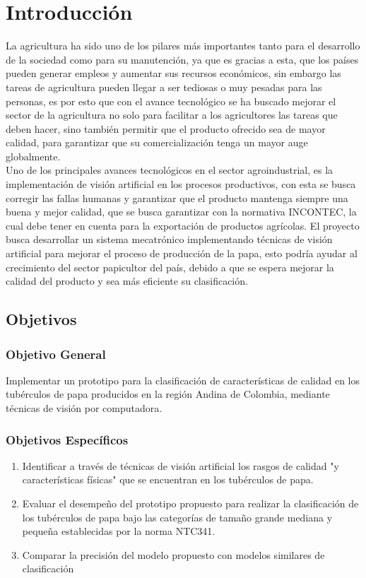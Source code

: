 \cleardoublepage %

\chapter{Introducción}

La agricultura ha sido uno de los pilares más importantes tanto para el desarrollo de la sociedad como para su manutención, ya que es gracias a esta, que los países pueden generar empleos y aumentar sus recursos económicos, sin embargo las tareas de agricultura pueden llegar a ser tediosas o muy pesadas para las personas, es por esto que con el avance tecnológico se ha buscado mejorar el sector de la agricultura no solo para facilitar a los agricultores las tareas que deben hacer, sino también permitir que el producto ofrecido sea de mayor calidad, para garantizar que su comercialización tenga un mayor auge globalmente.\\

Uno de los principales avances tecnológicos en el sector agroindustrial, es la implementación de visión artificial en los procesos productivos, con esta se busca corregir las fallas humanas y garantizar que el producto mantenga siempre una buena y mejor calidad, que se busca garantizar con la normativa INCONTEC, la cual debe tener en cuenta para la exportación de productos agrícolas. El proyecto busca desarrollar un sistema mecatrónico implementando técnicas de visión artificial para mejorar el proceso de producción de la papa, esto podría ayudar al crecimiento del sector papicultor del país, debido a que se espera mejorar la calidad del producto y sea más eficiente su clasificación.


\newpage
\section{Objetivos}

\subsection{Objetivo General}

Implementar un prototipo para la clasificación de características de calidad en los tubérculos de papa producidos en la región Andina de Colombia, mediante técnicas de visión por computadora.

\subsection{Objetivos Específicos}
\begin{enumerate}
	\item Identificar a través de técnicas de visión artificial los rasgos de calidad "y características físicas" que se encuentran en los tubérculos de papa. 
	\item Evaluar el desempeño del prototipo propuesto para realizar la clasificación de los tubérculos de papa bajo las categorías de tamaño grande mediana y pequeña establecidas por la norma NTC341. 
	\item Comparar la precisión del modelo propuesto con modelos similares de clasificación
\end{enumerate}

